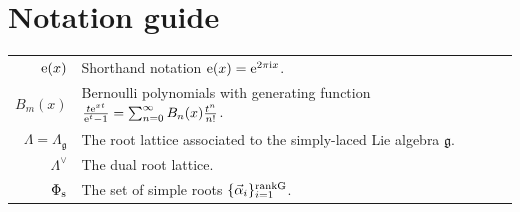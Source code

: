 \documentclass[10pt,a4paper]{amsart}
\def\al{\alpha}
\theoremstyle{definition}
\numberwithin{equation}{section}
\begin{document}
\section{Notation guide}
\label{sec:notation}
\begin{table}[!h]\renewcommand{\arraystretch}{1.25}\centering
	\begin{tabular}{r l}
		${\rm e}(x)$ & Shorthand notation ${\rm e}(x)={\rm e}^{2\pi\mathrm{i}x}$.
		\\
		$B_m(x)$ & Bernoulli polynomials with generating function $\frac{t{\rm e}^{xt}}{ {\rm e}^t-1} = \sum_{n=0}^\infty B_n(x)\frac{t^n}{ n!}$.
		\\
		$\Lambda=\Lambda_{\mathfrak{g}}$ & The root lattice associated to the simply-laced Lie algebra $\mathfrak{g}$.
\\
		$\Lambda^{\vee}$ & The dual root lattice.
\\
		$\Phi_{\rm s}$ & The set of simple roots $\{\vec{\al}_i\}_{i=1}^{\rm rankG}$.
			\end{tabular}
\end{table}
\end{document}
